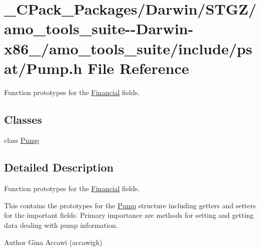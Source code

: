 \hypertarget{___c_pack___packages_2_darwin_2_s_t_g_z_2amo__tools__suite--_darwin-x86__64_2amo__tools__suite_2include_2psat_2_pump_8h}{}\section{\+\_\+\+C\+Pack\+\_\+\+Packages/\+Darwin/\+S\+T\+G\+Z/amo\+\_\+tools\+\_\+suite-\/-\/\+Darwin-\/x86\+\_/amo\+\_\+tools\+\_\+suite/include/psat/\+Pump.h File Reference}
\label{___c_pack___packages_2_darwin_2_s_t_g_z_2amo__tools__suite--_darwin-x86__64_2amo__tools__suite_2include_2psat_2_pump_8h}


Function prototypes for the \hyperlink{class_financial}{Financial} fields.  


\subsection*{Classes}
\begin{DoxyCompactItemize}
\item 
class \hyperlink{class_pump}{Pump}
\end{DoxyCompactItemize}


\subsection{Detailed Description}
Function prototypes for the \hyperlink{class_financial}{Financial} fields. 

This contains the prototypes for the \hyperlink{class_pump}{Pump} structure including getters and setters for the important fields. Primary importance are methods for setting and getting data dealing with pump information.

\begin{DoxyAuthor}{Author}
Gina Accawi (accawigk) 
\end{DoxyAuthor}
